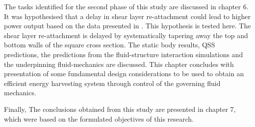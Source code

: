 The tasks identified for the second phase of this study are discussed in chapter 6. It was hypothesised that a delay in shear layer re-attachment could lead to higher power output based on the data presented in \citet{Luo1994}. This hypothesis is tested here. The shear layer re-attachment is delayed by systematically tapering away the top and bottom walls of the square cross section. The static body results, QSS predictions, the predictions from the fluid-structure interaction simulations and the underpinning fluid-mechanics are discussed. This chapter concludes with presentation of some fundamental design considerations to be used to obtain an efficient energy harvesting system through control of the governing fluid mechanics.

Finally, The conclusions obtained from this study are presented in chapter 7, which were based on the formulated objectives of this research.  

      









